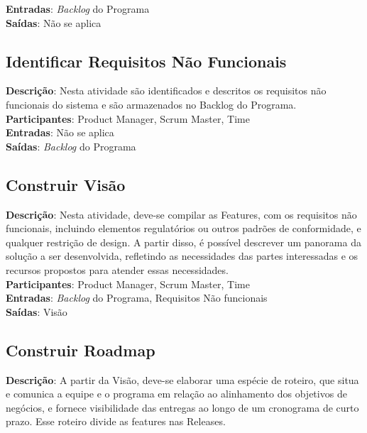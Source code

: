   \textbf{Entradas}: \textit{Backlog} do Programa \\
  
  \textbf{Saídas}:  Não se aplica\\
  
\subsection{Identificar Requisitos Não Funcionais}
  \textbf{Descrição}: Nesta atividade são identificados e descritos os requisitos não funcionais do sistema e são armazenados no Backlog do Programa.  \\
  
  \textbf{Participantes}: Product Manager, Scrum Master, Time \\
  
  \textbf{Entradas}:  Não se aplica\\
  
  \textbf{Saídas}:  \textit{Backlog} do Programa\\

\subsection{Construir Visão}
  \textbf{Descrição}: Nesta atividade, deve-se compilar as Features, com os requisitos não funcionais, incluindo elementos 
  regulatórios ou outros padrões de conformidade, e qualquer restrição de design. A partir disso, é possível descrever um panorama da solução a 
  ser desenvolvida, refletindo as necessidades das partes interessadas e os recursos propostos para atender essas necessidades. \\
  
  \textbf{Participantes}: Product Manager, Scrum Master, Time \\
  
  \textbf{Entradas}: \textit{Backlog} do Programa, Requisitos Não funcionais \\
  
  \textbf{Saídas}:  Visão\\
  
\subsection{Construir Roadmap}
  \textbf{Descrição}: A partir da Visão, deve-se elaborar uma espécie de roteiro, que situa e comunica a equipe e o programa em relação ao 
  alinhamento dos objetivos de negócios, e fornece visibilidade das entregas ao longo de um cronograma de curto prazo. 
  Esse roteiro divide as features nas Releases. \\
  
